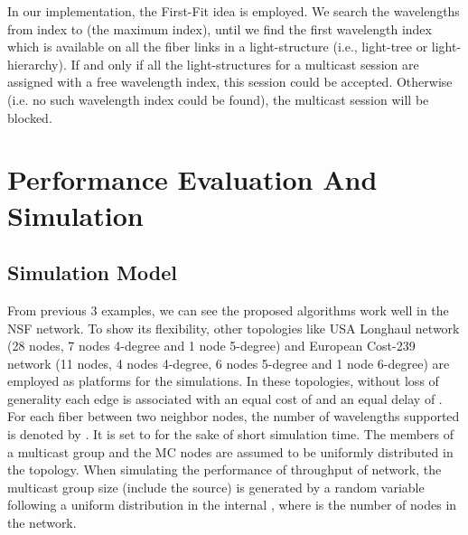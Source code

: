\documentclass[conference]{IEEEtran}
\begin{document}
In our implementation, the First-Fit idea is employed. We search the wavelengths from index  to  (the maximum index), until we find the first wavelength index which is available on all the fiber links in a light-structure (i.e., light-tree or light-hierarchy). If and only if all the light-structures for a multicast session are assigned with a free wavelength index, this session could be accepted. Otherwise (i.e. no such wavelength index could be found), the multicast session will be blocked.

\section{Performance Evaluation And Simulation}
\label{sec: Performance Evaluation And Simulation}
\subsection{Simulation Model}
\label{subsec: Simulation Model}
From previous 3 examples, we can see the proposed algorithms work well in the NSF network. To show its flexibility, other topologies like USA Longhaul network (28 nodes, 7 nodes 4-degree and 1 node 5-degree) and European Cost-239 network (11 nodes, 4 nodes 4-degree, 6 nodes 5-degree and 1 node 6-degree) are employed as platforms for the simulations. In these topologies, without loss of generality each edge is associated with an equal cost of  and an equal delay of . For each fiber between two neighbor nodes, the number of wavelengths supported is denoted by . It is set to  for the sake of short simulation time. The members of a multicast group and the MC nodes are assumed to be uniformly distributed in the topology. When simulating the performance of throughput of network, the multicast group size (include the source) is generated by a random variable following a uniform distribution in the internal , where  is the number of nodes in the network.
\end{document}
